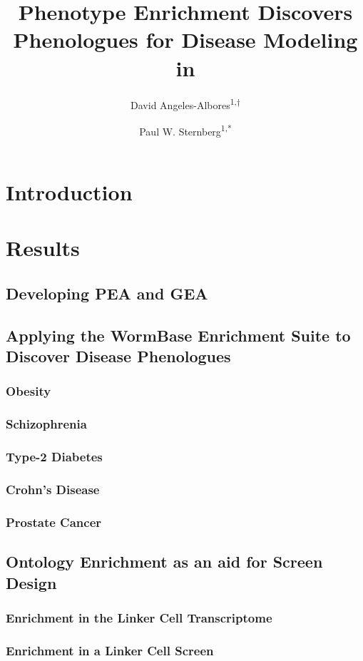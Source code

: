 \documentclass[10pt,letterpaper,twocolumn]{article}
\title{
  \Large
  \textbf{Phenotype Enrichment Discovers Phenologues for Disease Modeling in \cel{}}
}
\author{David Angeles-Albores\textsuperscript{1,$\dagger{}$}
\and{}
Paul W. Sternberg\textsuperscript{1,*}
}
\begin{document}

\twocolumn[
\maketitle


]
\nolinenumbers{}



\section*{Introduction}

\section*{Results}

\subsection*{Developing PEA and GEA}

\subsection*{Applying the WormBase Enrichment Suite to Discover Disease Phenologues}
\subsubsection*{Obesity}
\subsubsection*{Schizophrenia}
\subsubsection*{Type-2 Diabetes}
\subsubsection*{Crohn's Disease}
\subsubsection*{Prostate Cancer}

\subsection*{Ontology Enrichment as an aid for Screen Design}
\subsubsection*{Enrichment in the Linker Cell Transcriptome}
\subsubsection*{Enrichment in a Linker Cell Screen}
\end{document}
